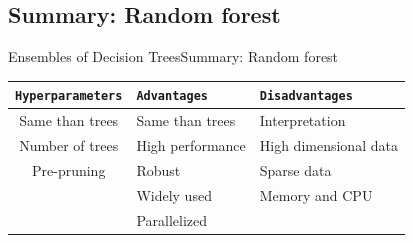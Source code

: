 \documentclass[10pt,compress]{beamer} %
\begin{document}
\subsection{Summary: Random forest}
\begin{frame}{Ensembles of Decision Trees}{Summary: Random forest}
	\begin{center}
	\begin{tabular}{cp{3cm}p{3cm}}\hline
	 	\texttt{Hyperparameters}  & \texttt{Advantages}  & \texttt{Disadvantages} \\\hline
	 	Same than trees           & Same than trees      & Interpretation  \\
	 	Number of trees           & High performance     & High dimensional data  \\
	 	Pre-pruning               & Robust               & Sparse data  \\
	 	                          & Widely used          & Memory and CPU  \\
	 	                          & Parallelized         &   \\
	 	\hline
	\end{tabular}
	\end{center}
\end{frame}
\end{document}

